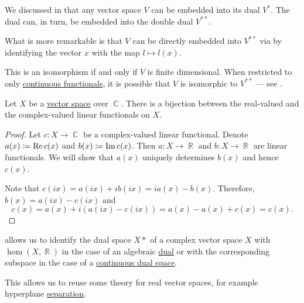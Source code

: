 \begin{remark}\label{rem:double_dual}
  We discussed in  that any vector space \( V \) can be embedded into its dual \( V^* \). The dual can, in turn, be embedded into the double dual \( V^{**} \).

  What is more remarkable is that \( V \) can be directly embedded into \( V^{**} \) via by identifying the vector \( x \) with the map \( l \mapsto l(x) \).

  This is an isomorphism if and only if \( V \) is finite dimensional. When restricted to only \hyperref[def:continuous_dual_space]{continuous functionals}, it is possible that \( V \) is isomorphic to \( V^{**} \) --- see .
\end{remark}

\begin{theorem}\label{thm:linear_functionals_over_c}
  Let \( X \) be a \hyperref[def:vector_space]{vector space} over \( \BbbC \). There is a bijection between the real-valued and the complex-valued linear functionals on \( X \).
\end{theorem}
\begin{proof}
  Let \( c: X \to \BbbC \) be a complex-valued linear functional. Denote \( a(x) \coloneqq \operatorname{Re} c(x) \) and \( b(x) \coloneqq \operatorname{Im} c(x) \). Then \( a: X \to \BbbR \) and \( b: X \to \BbbR \) are linear functionals. We will show that \( a(x) \) uniquely determines \( b(x) \) and hence \( c(x) \).

  Note that \( c(ix) = a(ix) + i b(ix) = i a(x) - b(x) \). Therefore, \( b(x) = a(ix) - c(ix) \) and
  \begin{equation*}
    c(x) = a(x) + i (a(ix) - c(ix)) = a(x) - a(x) + c(x) = c(x).
  \end{equation*}
\end{proof}

\begin{remark}\label{rem:linear_functionals_over_c}
   allows us to identify the dual space \( X* \) of a complex vector space \( X \) with \( \hom(X, \BbbR) \) in the case of an algebraic \hyperref[def:dual_vector_space]{dual} or with the corresponding subspace in the case of a \hyperref[def:continuous_dual_space]{continuous dual space}.

  This allows us to reuse some theory for real vector spaces, for example hyperplane \hyperref[def:hyperplane_separation]{separation}.
\end{remark}
